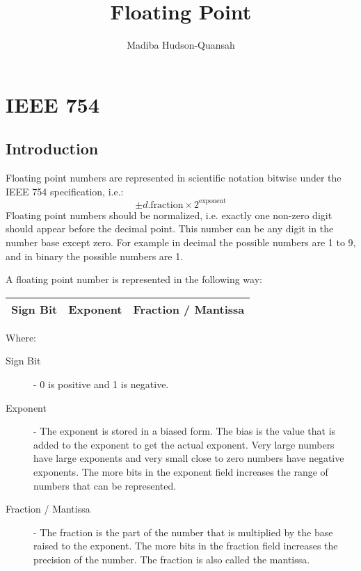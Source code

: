 \documentclass[12pt letter]{report}
\title{\Huge{Floating Point}}
\author{\huge{Madiba Hudson-Quansah}}
\date{}
\begin{document}
\maketitle
\newpage
{}
\tableofcontents
\pagebreak

\chapter{IEEE 754}

\section{Introduction}


Floating point numbers are represented in scientific notation bitwise under the IEEE 754 specification, i.e.:
\[
  \pm d.\text{fraction} \times 2^{\text{exponent}}
\]
Floating point numbers should be normalized, i.e. exactly one non-zero digit should appear before the decimal point. This number
can be any digit in the number base except zero.
For example in decimal the possible numbers are 1 to 9, and in binary the possible numbers are 1.

A floating point number is represented in the following way:
\begin{table}[h!]
  \begin{center}
    \begin{tabular}{|c|c|c|}
      \hline
      \textbf{Sign Bit} & \textbf{Exponent} & \textbf{Fraction / Mantissa} \\
      \hline
    \end{tabular}
  \end{center}
\end{table}
Where:
\begin{description}
  \item[Sign Bit]  - 0 is positive and 1 is negative.
  \item[Exponent] - The exponent is stored in a biased form. The bias is the value that is added to the exponent to get the actual exponent.
        Very large numbers have large exponents and very small close to zero numbers have negative exponents. The more bits in the
        exponent field increases the range of numbers that can be represented.
  \item[Fraction / Mantissa] - The fraction is the part of the number that is multiplied by the base raised to the exponent. The more bits in the
        fraction field increases the precision of the number. The fraction is also called the mantissa.
\end{description}
\end{document}
